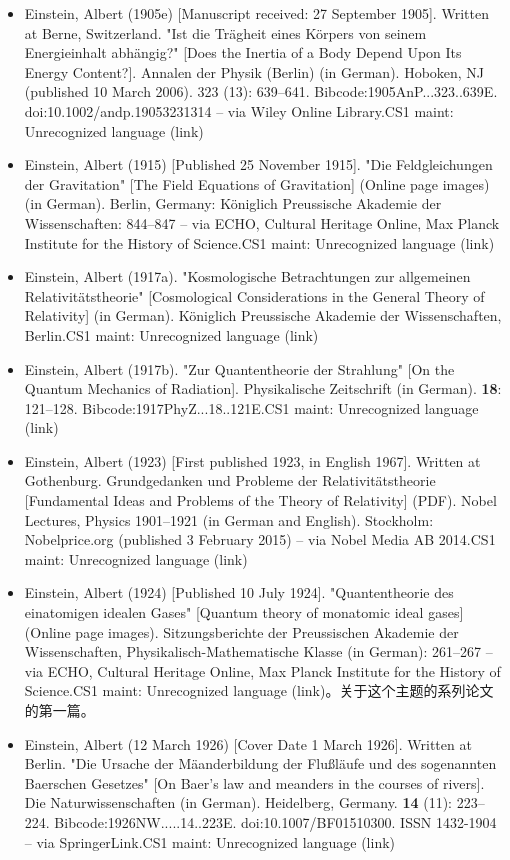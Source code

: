 \begin{itemize}
\item Einstein, Albert (1905e) [Manuscript received: 27 September 1905]. Written at Berne, Switzerland. "Ist die Trägheit eines Körpers von seinem Energieinhalt abhängig?" [Does the Inertia of a Body Depend Upon Its Energy Content?]. Annalen der Physik (Berlin) (in German). Hoboken, NJ (published 10 March 2006). 323 (13): 639–641. Bibcode:1905AnP...323..639E. doi:10.1002/andp.19053231314 – via Wiley Online Library.CS1 maint: Unrecognized language (link)
\item Einstein, Albert (1915) [Published 25 November 1915]. "Die Feldgleichungen der Gravitation" [The Field Equations of Gravitation] (Online page images) (in German). Berlin, Germany: Königlich Preussische Akademie der Wissenschaften: 844–847 – via ECHO, Cultural Heritage Online, Max Planck Institute for the History of Science.CS1 maint: Unrecognized language (link)
\item Einstein, Albert (1917a). "Kosmologische Betrachtungen zur allgemeinen Relativitätstheorie" [Cosmological Considerations in the General Theory of Relativity] (in German). Königlich Preussische Akademie der Wissenschaften, Berlin.CS1 maint: Unrecognized language (link)
\item Einstein, Albert (1917b). "Zur Quantentheorie der Strahlung" [On the Quantum Mechanics of Radiation]. Physikalische Zeitschrift (in German). \textbf{18}: 121–128. Bibcode:1917PhyZ...18..121E.CS1 maint: Unrecognized language (link)
\item Einstein, Albert (1923) [First published 1923, in English 1967]. Written at Gothenburg. Grundgedanken und Probleme der Relativitätstheorie [Fundamental Ideas and Problems of the Theory of Relativity] (PDF). Nobel Lectures, Physics 1901–1921 (in German and English). Stockholm: Nobelprice.org (published 3 February 2015) – via Nobel Media AB 2014.CS1 maint: Unrecognized language (link)
\item Einstein, Albert (1924) [Published 10 July 1924]. "Quantentheorie des einatomigen idealen Gases" [Quantum theory of monatomic ideal gases] (Online page images). Sitzungsberichte der Preussischen Akademie der Wissenschaften, Physikalisch-Mathematische Klasse (in German): 261–267 – via ECHO, Cultural Heritage Online, Max Planck Institute for the History of Science.CS1 maint: Unrecognized language (link)。关于这个主题的系列论文的第一篇。
\item Einstein, Albert (12 March 1926) [Cover Date 1 March 1926]. Written at Berlin. "Die Ursache der Mäanderbildung der Flußläufe und des sogenannten Baerschen Gesetzes" [On Baer's law and meanders in the courses of rivers]. Die Naturwissenschaften (in German). Heidelberg, Germany. \textbf{14 } (11): 223–224. Bibcode:1926NW.....14..223E. doi:10.1007/BF01510300. ISSN 1432-1904 – via SpringerLink.CS1 maint: Unrecognized language (link)

\end{itemize}
